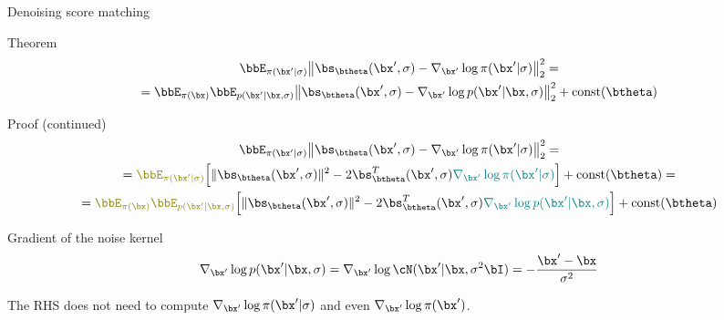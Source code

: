 \begin{frame}{Denoising score matching}
	\begin{block}{Theorem}
	\vspace{-0.7cm}
	\begin{multline*}
		\bbE_{\pi(\bx' | \sigma)}\bigl\| \bs_{\btheta}(\bx', \sigma) - \nabla_{\bx'} \log \pi(\bx' | \sigma) \bigr\|^2_2 = \\
		= \bbE_{\pi(\bx)} \bbE_{p(\bx' | \bx, \sigma)}\bigl\| \bs_{\btheta}(\bx', \sigma) - \nabla_{\bx'} \log p(\bx' | \bx, \sigma) \bigr\|^2_2 + \text{const}(\btheta)
	\end{multline*}
	\vspace{-0.9cm}
	\end{block}
	\begin{block}{Proof (continued)}
		\vspace{-0.7cm}
		{\small
		\begin{multline*}
			\bbE_{\pi(\bx' | \sigma)}\bigl\| \bs_{\btheta}(\bx', \sigma) - \nabla_{\bx'} \log \pi(\bx' | \sigma) \bigr\|^2_2 = \\ 
			= {\color{olive}\bbE_{\pi(\bx' | \sigma)}} \Bigl[\| \bs_{\btheta}(\bx', \sigma) \|^2 - 2 \bs_{\btheta}^T(\bx', \sigma) {\color{teal}\nabla_{\bx'} \log \pi(\bx' | \sigma)} \Bigr] + \text{const}(\btheta) = \\
			= {\color{olive}\bbE_{\pi(\bx)} \bbE_{p(\bx' | \bx, \sigma)}}\Bigl[\| \bs_{\btheta}(\bx', \sigma) \|^2 - 2 \bs_{\btheta}^T(\bx', \sigma) {\color{teal}\nabla_{\bx'} \log p(\bx' | \bx, \sigma)} \Bigr] + \text{const}(\btheta)
		\end{multline*}
		}
		\vspace{-0.8cm}
	\end{block}
	\begin{block}{Gradient of the noise kernel}
	\vspace{-0.4cm}
	\[
		\nabla_{\bx'} \log p(\bx' | \bx, \sigma) = \nabla_{\bx'} \log \cN(\bx' | \bx, \sigma^2 \bI) = - \frac{\bx' - \bx}{\sigma^2}
	\]
	\vspace{-0.5cm}
	\end{block}
	The RHS does not need to compute $\nabla_{\bx'} \log \pi(\bx' | \sigma)$ and even $\nabla_{\bx'} \log \pi(\bx')$.
\end{frame}

